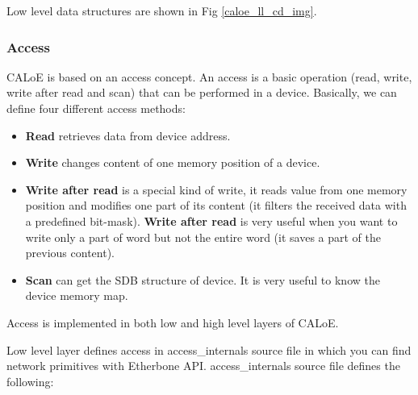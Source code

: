 Low level data structures are shown in Fig \ref{caloe_ll_cd_img}.

\subsubsection{Access}

CALoE is based on an access concept. An access is a basic operation (read, write, write after read and scan) that can be performed in a device. Basically, we can define four different access methods:

\begin{itemize}
 \item {\textbf{Read} retrieves data from device address. }
 \item{\textbf{Write} changes content of one memory position of a device. }
 \item{\textbf{Write after read} is a special kind of write, it reads value from one memory position and modifies one part of its content (it filters the received data with a predefined bit-mask). \textbf{Write after read} is very useful when you want to write only a part of word but not the entire word (it saves a part of the previous content). }
 \item{\textbf{Scan} can get the SDB structure of device. It is very useful to know the device memory map.}
\end{itemize}

Access is implemented in both low and high level layers of CALoE. 

Low level layer defines access in access\_internals source file in which you can find network primitives with Etherbone API. 
access\_internals source file defines the following:

